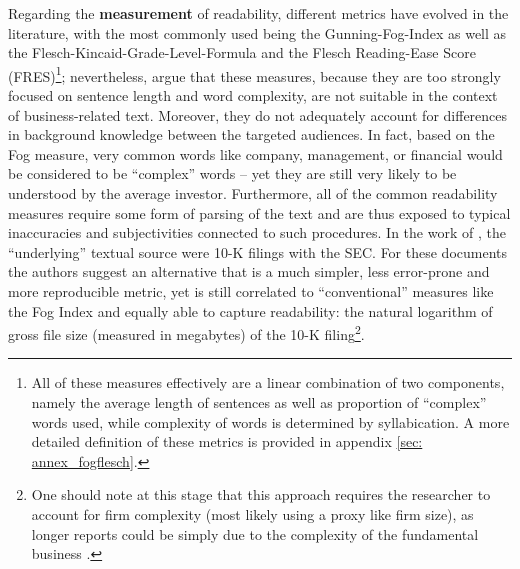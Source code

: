 
Regarding the \textbf{measurement} of readability, different metrics have evolved in the literature, with the most commonly used being the Gunning-Fog-Index as well as the Flesch-Kincaid-Grade-Level-Formula and the Flesch Reading-Ease Score (FRES)\footnote{All of these measures effectively are a linear combination of two components, namely the average length of sentences as well as proportion of \enquote{complex} words used, while complexity of words is determined by syllabication. A more detailed definition of these metrics is provided in appendix \ref{sec: annex_fogflesch}.}; nevertheless, \textcite[1649]{Loughran2014} argue that these measures, because they are too strongly focused on sentence length and word complexity, are not suitable in the context of business-related text. Moreover, they do not adequately account for differences in background knowledge between the targeted audiences. In fact, based on the Fog measure, very common words like \textsf{company}, \textsf{management}, or \textsf{financial} would be considered to be \enquote{complex} words -- yet they are still very likely to be understood by the average investor. Furthermore, all of the common readability measures require some form of parsing of the text and are thus exposed to typical inaccuracies and subjectivities connected to such procedures. In the work of \textcite{Loughran2014}, the \enquote{underlying} textual source were 10-K filings with the SEC. For these documents the authors suggest an alternative that is a much simpler, less error-prone and more reproducible metric, yet is still correlated to \enquote{conventional} measures like the Fog Index and equally able to capture readability: the natural logarithm of gross file size (measured in megabytes) of the 10-K filing\footnote{One should note at this stage that this approach requires the researcher to account for firm complexity (most likely using a proxy like firm size), as longer reports could be simply due to the complexity of the fundamental business \parencite{LM-meta-2016}. }.

